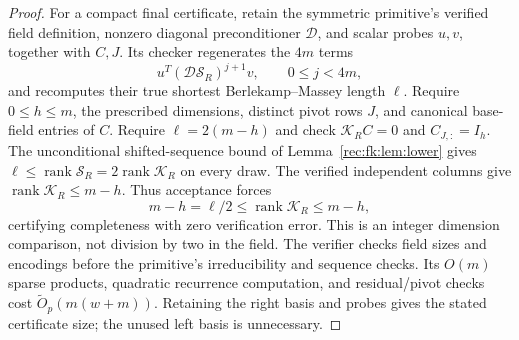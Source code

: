 \documentclass[11pt]{article}
\theoremstyle{definition}
\theoremstyle{remark}
\newcommand{\1}{\mathbf 1}
\providecommand{\rank}{\operatorname{rank}}
\begin{document}
\begin{proof}
For a compact final certificate, retain the symmetric primitive's
verified field definition, nonzero diagonal preconditioner $\mathcal D$,
and scalar probes $u,v$, together with $C,J$. Its checker regenerates
the $4m$ terms
\[
 u^T(\mathcal D\mathcal S_R)^{j+1}v,
 \qquad 0\le j<4m,
\]
and recomputes their true shortest Berlekamp--Massey length $\ell$.
Require $0\le h\le m$, the prescribed dimensions, distinct pivot
rows $J$, and canonical base-field entries of $C$. Require
$\ell=2(m-h)$ and check $\mathcal K_RC=0$ and $C_{J,:}=I_h$.
The unconditional shifted-sequence bound of Lemma~\ref{rec:fk:lem:lower}
gives $\ell\le\rank\mathcal S_R=2\rank\mathcal K_R$ on every draw.
The verified independent columns give $\rank\mathcal K_R\le m-h$.
Thus acceptance forces
\[
 m-h=\ell/2\le\rank\mathcal K_R\le m-h,
\]
certifying completeness with zero verification error. This is an
integer dimension comparison, not division by two in the field.
The verifier checks field sizes and encodings before the primitive's
irreducibility and sequence checks. Its $O(m)$ sparse products,
quadratic recurrence computation, and residual/pivot checks cost
$\widetilde O_p(m(w+m))$. Retaining the right basis and probes gives
the stated certificate size; the unused left basis is unnecessary.
\end{proof}
\end{document}
